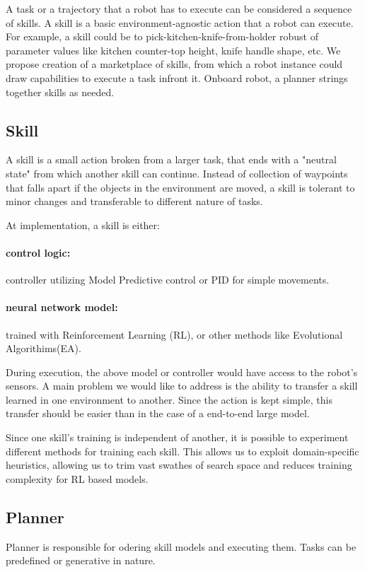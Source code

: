 
A task or a trajectory that a robot has to execute can be considered a sequence of skills. A skill is a basic environment-agnostic action that a robot can execute. For example, a skill could be to pick-kitchen-knife-from-holder robust of parameter values like kitchen counter-top height, knife handle shape, etc.  
We propose creation of a marketplace of skills, from which a robot instance could draw capabilities to execute a task infront it. Onboard robot, a planner strings together skills as needed. 

\subsection{Skill}
A skill is a small action broken from a larger task, that ends with a "neutral state" from which another skill can continue.
Instead of collection of waypoints that falls apart if the objects in the environment are moved, a skill is tolerant to minor changes and transferable to different nature of tasks. 

At implementation, a skill is either:
\paragraph{control logic:} controller utilizing Model Predictive control or PID for simple movements.
\paragraph{neural network model:} trained with Reinforcement Learning (RL), or other methods like Evolutional Algorithims(EA).

During execution, the above model or controller would have access to the robot's sensors. A main problem we would like to address is the ability to transfer a skill learned in one environment to another. Since the action is kept simple, this transfer should be easier than in the case of a end-to-end large model.

Since one skill's training is independent of another, it is possible to experiment different methods for training each skill.
This allows us to exploit domain-specific heuristics, allowing us to trim vast swathes of search space and reduces training complexity for RL based models.
 
\subsection{Planner}
Planner is responsible for odering skill models and executing them. Tasks can be predefined or generative in nature.

